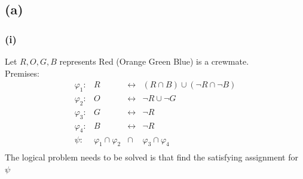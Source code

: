 \documentclass{article} %
\begin{document}
\subsection*{(a)}
\subsubsection*{(i)}
Let $R,O,G,B$ represents Red (Orange Green Blue) is a crewmate.\\
Premises:\\
\[\begin{array}{lrcl}
    \varphi_1: & R &\leftrightarrow& (R \cap B) \cup (\neg R\cap \neg B)\\
    \varphi_2: & O &\leftrightarrow& \neg R \cup \neg G\\
    \varphi_3: & G &\leftrightarrow& \neg R\\
    \varphi_4: & B &\leftrightarrow& \neg R\\
    \psi: &\varphi_1 \cap \varphi_2 &\cap& \varphi_3 \cap \varphi_4\\
\end{array}\]
The logical problem needs to be solved is that find the satisfying assignment for $\psi$\\
\end{document}
